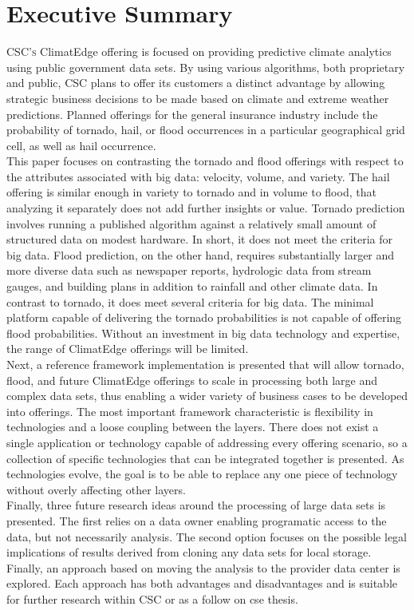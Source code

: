 \section{Executive Summary}
\textsc{CSC's} ClimatEdge\texttrademark{} offering is focused on providing predictive climate analytics using public government data sets. By using various algorithms, both proprietary and public, \textsc{CSC} plans to offer its customers a distinct advantage by allowing strategic business decisions to be made based on climate and extreme weather predictions. Planned offerings for the general insurance industry include the probability of tornado, hail, or flood occurrences in a particular geographical grid cell, as well as hail occurrence.\\

This paper focuses on contrasting the tornado and flood offerings with respect to the attributes associated with big data: velocity, volume, and variety. The hail offering is similar enough in variety to tornado and in volume to flood, that analyzing it separately does not add further insights or value. Tornado prediction involves running a published algorithm against a relatively small amount of structured data on modest hardware. In short, it does not meet the criteria for big data. Flood prediction, on the other hand, requires substantially larger and more diverse data such as newspaper reports, hydrologic data from stream gauges, and building plans in addition to rainfall and other climate data.  In contrast to tornado, it does meet several criteria for big data. The minimal platform capable of delivering the tornado probabilities is not capable of offering flood probabilities. Without an investment in big data technology and expertise, the range of ClimatEdge offerings will be limited.\\

Next, a reference framework implementation is presented that will allow tornado, flood, and future ClimatEdge offerings to scale in processing both large and complex data sets, thus enabling a wider variety of business cases to be developed into offerings. The most important framework characteristic is flexibility in technologies and a loose coupling between the layers. There does not exist a single application or technology capable of addressing every offering scenario, so a collection of specific technologies that can be integrated together is presented. As technologies evolve, the goal is to be able to replace any one piece of technology without overly affecting other layers.\\

Finally, three future research ideas around the processing of large data sets is presented. The first relies on a data owner enabling programatic access to the data, but not necessarily analysis.  The second option focuses on the possible legal implications of results derived from cloning any data sets for local storage. Finally, an approach based on moving the analysis to the provider data center is explored. Each approach has both advantages and disadvantages and is suitable for further research within \textsc{CSC} or as a follow on \gls{cse} thesis.